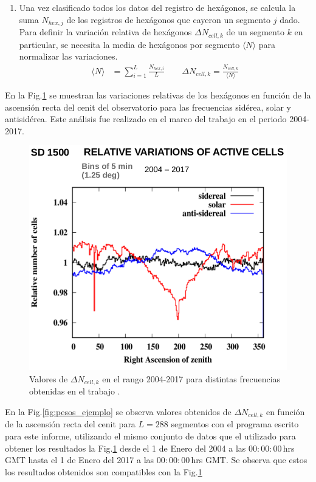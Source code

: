 \begin{enumerate}
        \item Una vez clasificado todos los datos del registro de hexágonos, se calcula la suma  $N_{hex, j}$ de los registros de hexágonos que cayeron un segmento $j$ dado. Para definir la variación relativa de hexágonos  $\Delta N_{cell,k}$ de un segmento $k$ en particular, se necesita la media de hexágonos por segmento $ \langle N \rangle$  para normalizar las variaciones.
       \begin{align}
         \langle N \rangle &= \sum^{L}_{i=1} \frac{N_{hex, i}}{L}  \qquad
         \Delta N_{cell,k} = \frac{N_{cell, k}}{\langle N \rangle}  \label{epepe}
       \end{align}

      \end{enumerate}

      En la Fig.\ref{fig:pesos_referencia} se muestran las variaciones relativas de los hexágonos en función de la ascensión recta del cenit del observatorio para las frecuencias sidérea, solar y antisidérea. Este análisis fue realizado en el marco del trabajo \cite{referencia_pesos} en el periodo 2004-2017. 

          \begin{figure}[H]
          \centering
              \includegraphics[width=0.5\linewidth]{pesos_referencia.png}  
              \caption{Valores de $\Delta N_{cell, k}$ en el rango 2004-2017 para distintas frecuencias obtenidas en el trabajo \cite{referencia_pesos}.}
              \label{fig:pesos_referencia}
        \end{figure}

       En la Fig.\ref{fig:pesos_ejemplo} se observa valores obtenidos de $\Delta N_{cell,k}$ en función de la ascensión recta del cenit  para $L=288$ segmentos con el programa escrito para este informe, utilizando el mismo conjunto de datos que el utilizado para obtener los resultados la Fig.\ref{fig:pesos_referencia} desde el 1 de Enero del 2004 a las $00:00:00\,$hrs GMT  hasta el 1 de Enero del 2017 a las $00:00:00\,$hrs GMT. Se  observa que estos los resultados obtenidos son compatibles con la Fig.\ref{fig:pesos_referencia}
 

